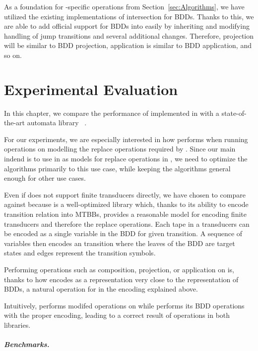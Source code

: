 As a foundation for \nft-specific operations from Section~\ref{sec:Algorithms}, we have utilized the existing implementations of intersection for BDDs.
Thanks to this, we are able to add official support for BDDs into \mata easily by inheriting \nft and modifying handling of jump transitions and several additional changes.
Therefore, \nft projection will be similar to BDD projection, \nft application is similar to BDD application, and so on.


\chapter{Experimental Evaluation}

In this chapter, we compare the performance of \nfts implemented in \mata with a state-of-the-art automata library \mona~\cite{mona}.

For our experiments, we are especially interested in how \mata performs when running operations on \nfts modelling the replace operations required by \noodler.
Since our main indend is to use \nfts in \mata as models for replace operations in \noodler, we need to optimize the \nft algorithms primarily to this use case, while keeping the \nft algorithms general enough for other use cases.

Even if \mona does not support finite transducers directly, we have chosen \mona to compare \mata against because \mona is a well-optimized library which, thanks to its ability to encode transition relation into MTBBs, provides a reasonable model for encoding finite transducers and therefore the replace operations.
Each tape in a transducers can be encoded as a single variable in the BDD for given transition.
A sequence of variables then encodes an \nft transition where the leaves of the BDD are target states and edges represent the transition symbols.

Performing operations such as composition, projection, or application on \nfts is, thanks to how \mata encodes \nfts as a representation very close to the representation of BDDs, a natural operation for \mona in the encoding explained above.

Intuitively, \mata performs modifed \nfa operations on \nfts while \mona performs its BDD operations with the proper encoding, leading to a correct result of \nft operations in both libraries.

\paragraph{Benchmarks.}

